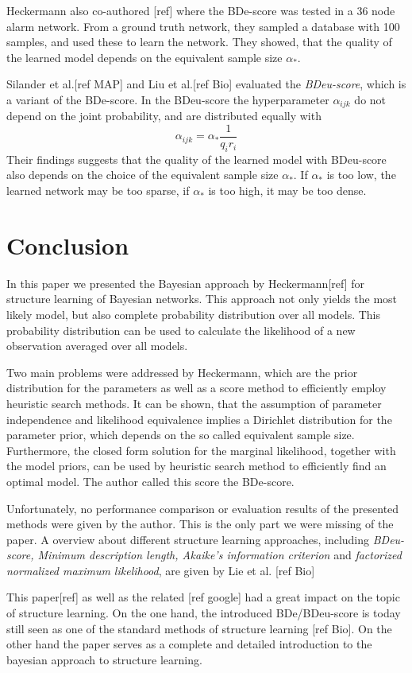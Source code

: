 \documentclass{article}
\begin{document}
Heckermann also co-authored [ref] where the BDe-score was tested in a 36 node alarm network.
From a ground truth network, they sampled a database with 100 samples, and used these to learn
the network. They showed, that the quality of the learned model depends on the equivalent
sample size $\alpha_*$.

Silander et al.[ref MAP] and Liu et al.[ref Bio] evaluated the \textit{BDeu-score}, which is a variant
of the BDe-score. In the BDeu-score the hyperparameter $\alpha_{ijk}$ do not depend on the joint
probability, and are distributed equally with
\[
	\alpha_{ijk} = \alpha_*\frac{1}{q_ir_i}
\]
Their findings suggests that the quality of the learned model with BDeu-score also depends on 
the choice of the equivalent sample size $\alpha_*$. If $\alpha_*$ is too low, the learned network
may be too sparse, if $\alpha_*$ is too high, it may be too dense.

\section{Conclusion}
In this paper we presented the Bayesian approach by Heckermann[ref] for structure learning of
Bayesian networks. This approach not only yields the most likely model, but also complete
probability distribution over all models. This probability distribution can be used to calculate
the likelihood of a new observation averaged over all models.

Two main problems were addressed by Heckermann, which are the prior distribution for the parameters
as well as a score method to efficiently employ heuristic search methods. It can be shown, that
the assumption of parameter independence and likelihood equivalence implies a Dirichlet distribution
for the parameter prior, which depends on the so called equivalent sample size. Furthermore, the closed
form solution for the marginal likelihood, together with the model priors, can be used by heuristic
search method to efficiently find an optimal model. The author called this score the BDe-score.

Unfortunately, no performance comparison or evaluation results of the presented methods were given
by the author. This is the only part we were missing of the paper.
A overview about different structure learning approaches, including \textit{BDeu-score,
Minimum description length, Akaike's information criterion} and \textit{factorized normalized
maximum likelihood}, are given by Lie et al. [ref Bio]

This paper[ref] as well as the related [ref google] had a great impact on the topic of structure learning.
On the one hand, the introduced BDe/BDeu-score is today still seen as one of the standard methods of
structure learning [ref Bio]. On the other hand the paper serves as a complete and detailed introduction
to the bayesian approach to structure learning.





\end{document}
